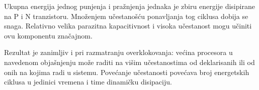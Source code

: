 Ukupna energija jednog punjenja i pražnjenja jednaka je zbiru energije disipirane na P i N tranzistoru. Množenjem učestanošću ponavljanja tog ciklusa dobija se snaga. Relativno velika parazitna kapacitivnost i visoka učestanost mogu učiniti ovu komponentu značajnom.

Rezultat je zanimljiv i pri razmatranju overklokovanja: većina procesora u navedenom objašnjenju može raditi na višim učestanostima od deklarisanih ili od onih na kojima radi u sistemu. Povećanje učestanosti povećava broj energetskih ciklusa u jedinici vremena i time dinamičku disipaciju.

